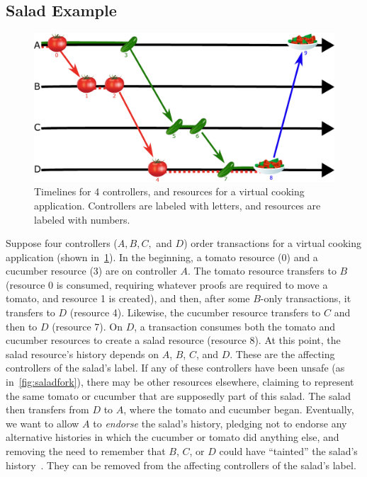 \documentclass[a4paper,USenglish,cleveref, autoref, thm-restate, anonymous]{lipics-v2021}
\begin{document}
\subsection{Salad Example}
\begin{figure}
    \centering
    \includegraphics[width=\linewidth]{figs/salad_timeline.pdf}
    \caption{Timelines for 4 controllers, and resources for a virtual cooking application. Controllers are labeled with letters, and resources are labeled with numbers.}
    \label{fig:salad}
\end{figure}
Suppose four controllers ($A,B,C,$ and $D$) order transactions for a virtual cooking application (shown in~\cref{fig:salad}).
In the beginning, a tomato resource (0) and a cucumber resource (3) are on controller $A$.
The tomato resource transfers to $B$ (resource 0 is consumed, requiring whatever proofs are required to move a tomato, and resource 1 is created), and then, after some $B$-only transactions, it transfers to $D$ (resource 4).
Likewise, the cucumber resource transfers to $C$ and then to $D$ (resource 7).
On $D$, a transaction consumes both the tomato and cucumber resources to create a salad resource (resource 8). 
At this point, the salad resource's history depends on $A$, $B$, $C$, and $D$.
These are the affecting controllers of the salad's label.
If any of these controllers have been unsafe (as in~\cref{fig:saladfork}), there may be other resources elsewhere, claiming to represent the same tomato or cucumber that are supposedly part of this salad. 
The salad then transfers from $D$ to $A$, where the tomato and cucumber began.
Eventually, we want to allow $A$ to \emph{endorse} the salad's history, pledging not to endorse any alternative histories in which the cucumber or tomato did anything else, and removing the need to remember that $B$, $C$, or $D$ could have ``tainted'' the salad's history~\cite{dista}. 
They can be removed from the affecting controllers of the salad's label.
\end{document}
